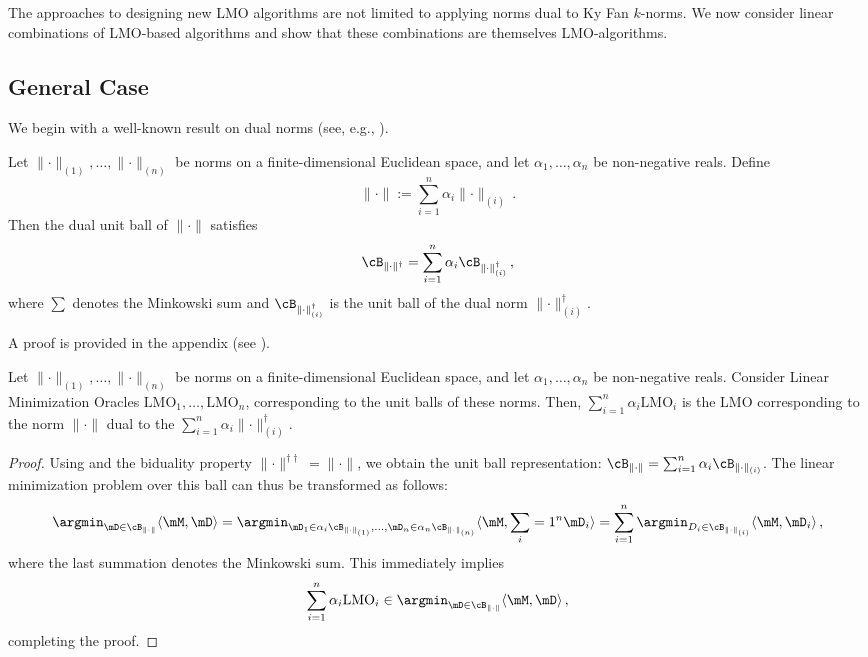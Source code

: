 \documentclass[pmlr]{jmlr}%
\newcommand{\norm}[1]{\lVert #1\rVert}
\def\<#1,#2>{\langle #1,#2\rangle}
\begin{document}
 The approaches to designing new LMO algorithms are not limited to applying norms dual to Ky Fan $k$-norms. We now consider linear combinations of LMO-based algorithms and show that these combinations are themselves LMO-algorithms.
 
 \subsection{General Case}
 We begin with a well-known result on dual norms (see, e.g., \citep[Table 1]{yu2012arithmetic}).
 
 \begin{lemma}\label{lemma:dual_to_conv_comb}
   Let $\norm{\cdot}_{(1)},\dots,\norm{\cdot}_{(n)}$ be norms on a finite-dimensional Euclidean space, and let $\alpha_1,\dots,\alpha_n$ be non-negative reals. Define
   \[
     \norm{\cdot} := \sum_{i = 1}^n \alpha_i \norm{\cdot}_{(i)}\,.
   \]
   Then the dual unit ball of $\norm{\cdot}$ satisfies
   \[
     \cB_{\norm{\cdot}^\dagger}
     = \sum_{i = 1}^n \alpha_i \cB_{\norm{\cdot}_{(i)}^\dagger}\,,
   \]
   where $\sum$ denotes the Minkowski sum and $\cB_{\norm{\cdot}_{(i)}^\dagger}$ is the unit ball of the dual norm $\norm{\cdot}_{(i)}^\dagger$.
 \end{lemma}
 
 A proof is provided in the appendix (see ).
 
 \begin{lemma}\label{lemma:lin_comb_lmo}
   Let $\norm{\cdot}_{(1)}, \dots, \norm{\cdot}_{(n)}$ be norms on a finite-dimensional Euclidean space, and let $\alpha_1, \dots, \alpha_n$ be non-negative reals. Consider Linear Minimization Oracles $\mathrm{LMO}_{1}, \dots, \mathrm{LMO}_{n}$, corresponding to the unit balls of these norms. Then, $\sum_{i = 1}^n \alpha_i \mathrm{LMO}_{i}$ is the LMO corresponding to the norm $\norm{\cdot}$ dual to the $\sum_{i = 1}^n \alpha_i \norm{\cdot}_{(i)}^\dagger$.
 \end{lemma}
 
 \begin{proof}
   Using  and the biduality property $\norm{\cdot}^{\dagger \dagger} = \norm{\cdot}$, we obtain the unit ball representation: $\cB_{\norm{\cdot}} = \sum_{i = 1}^n \alpha_i \cB_{\norm{\cdot}_{(i)}}$. The linear minimization problem over this ball can thus be transformed as follows:
   \[
   \argmin_{\mD \in \cB_{\norm{\cdot}}}\<\mM, \mD> = \argmin_{\mD_1 \in \alpha_i \cB_{\norm{\cdot}_{(1)}},\dots,\mD_n \in \alpha_n\cB_{\norm{\cdot}_{(n)}}}\<\mM, \sum_{i = 1}^n\mD_i> = \sum_{i = 1}^n \argmin_{D_i \in \cB_{\norm{\cdot}_{(i)}}}\<\mM, \mD_i>\,,
   \]
   where the last summation denotes the Minkowski sum. This immediately implies 
   \[
   \sum_{i = 1}^n \alpha_i \mathrm{LMO}_{i} \in \argmin_{\mD \in \cB_{\norm{\cdot}}}\<\mM, \mD>\,,
   \] 
   completing the proof.
 \end{proof}
 
\end{document}
